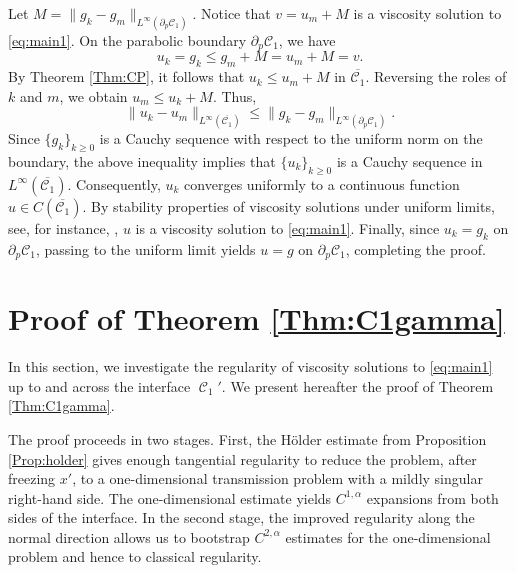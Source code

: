 \documentclass[12pt]{article}
\makeatletter
\newenvironment{customproof}[1]{%
  \par\pushQED{\qed}%
  \normalfont\topsep6pt \trivlist
  \item[\hskip\labelsep\itshape
    Proof of #1\@addpunct{.}]\ignorespaces
}{%
  \popQED\endtrivlist\@endpefalse
}
\numberwithin{Theorem}{section}
\theoremstyle{definition}
\theoremstyle{remark}
\numberwithin{equation}{section}
\DeclareMathOperator{\C}{\mathcal{C}}
\makeatother
\begin{document}
\begin{customproof}{Theorem \ref{thm:existence}}
Let $M = \|g_k - g_m\|_{L^\infty(\partial_p \mathcal{C}_1)}$. Notice that $v = u_m + M$ is a viscosity solution to \eqref{eq:main1}. 
On the parabolic boundary $\partial_p \mathcal{C}_1$, we have
\[
u_k = g_k \le g_m + M = u_m + M = v.
\]
By Theorem \ref{Thm:CP}, it follows that $u_k \le u_m + M$ in $\overline{\mathcal{C}_1}$. Reversing the roles of $k$ and $m$, we obtain $u_m \le u_k + M$. Thus,
\[
\|u_k - u_m\|_{L^\infty(\overline{\mathcal{C}_1})} \le \|g_k - g_m\|_{L^\infty(\partial_p \mathcal{C}_1)}.
\]
Since $\{g_k\}_{k \geq 0}$ is a Cauchy sequence with respect to the uniform norm on the boundary, the above inequality implies that $\{u_k\}_{k \geq 0}$ is a Cauchy sequence in $L^\infty(\overline{\mathcal{C}_1})$. Consequently, $u_k$ converges uniformly to a continuous function $u \in C(\overline{\mathcal{C}_1})$. By stability properties of viscosity solutions under uniform limits, see, for instance, \cite[Proposition 2.9]{CC}, $u$ is a viscosity solution to \eqref{eq:main1}. Finally, since $u_k = g_k$ on $\partial_p \mathcal{C}_1$, passing to the uniform limit yields $u = g$ on $\partial_p \mathcal{C}_1$, completing the proof.
\end{customproof}





\section{Proof of Theorem \ref{Thm:C1gamma}}\label{sec:C1gamma}


In this section, we investigate the regularity of viscosity solutions to \eqref{eq:main1} up to and across the interface $\C_1'$. We present hereafter the proof of Theorem \ref{Thm:C1gamma}.


The proof proceeds in two stages. First, the H\"older estimate from Proposition \ref{Prop:holder} gives enough tangential regularity to reduce the problem, after freezing \(x'\), to a one-dimensional transmission problem with a mildly singular right-hand side. The one-dimensional estimate yields \(C^{1,\alpha}\) expansions from both sides of the interface. In the second stage, the improved regularity along the normal direction allows us to bootstrap \(C^{2,\alpha}\) estimates for the
one-dimensional problem and hence to classical
regularity.
\end{document}
